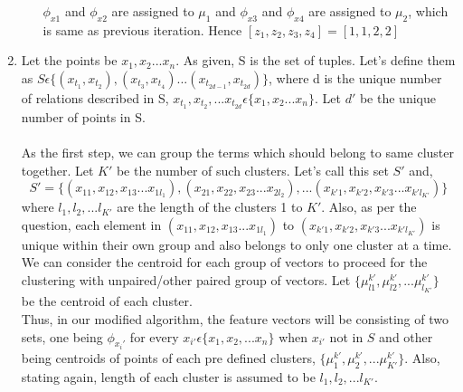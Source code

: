 \documentclass[12pt]{article}
\begin{document}
\begin{enumerate}[label=(\alph*)]
\begin{enumerate}[label=(\arabic*)]
	$\phi_{x1}$ and $\phi_{x2}$ are assigned to $\mu_1$ and $\phi_{x3}$ and $\phi_{x4}$ are assigned to $\mu_2$, which is same as previous iteration. Hence $[z_1, z_2, z_3, z_4] = [1,1,2,2] $\\
	\end{enumerate}
	\item Let the points be $x_1, x_2 ... x_n$. As given, S is the set of tuples. Let's define them as $S \epsilon \{(x_{t_1}, x_{t_2}), (x_{t_3}, x_{t_4})...(x_{t_{2d-1}}, x_{t_{2d}})\}$, where d is the unique number of relations described in S, $x_{t_1}, x_{t_2}, ... x_{t_{2d}} \epsilon \{x_1, x_2 ... x_n\}$. Let $d'$ be the unique number of points in S. \\ \\
	As the first step, we can group the terms which should belong to same cluster together. Let $K'$ be the number of such clusters. Let's call this set $S'$ and, $$S' = \{(x_{11}, x_{12}, x_{13} ... x_{1l_1}), (x_{21}, x_{22}, x_{23} ... x_{2l_2}), ... (x_{k'1}, x_{k'2}, x_{k'3} ... x_{k'l_{K'}})\}$$
	where $l_1, l_2, ... l_{K'}$ are the length of the clusters 1 to $K'$. Also, as per the question, each element in $(x_{11}, x_{12}, x_{13} ... x_{1l_1})$ to $(x_{k'1}, x_{k'2}, x_{k'3} ... x_{k'l_{K'}})$ is unique within their own group and also belongs to only one cluster at a time. \\
	We can consider the centroid for each group of vectors to proceed for the clustering with unpaired/other paired group of vectors. Let $\{ \mu_{l1}^{k'}, \mu_{l2}^{k'}, ... \mu_{l_{K'}}^{k'} \}$ be the centroid of each cluster. \\
	Thus, in our modified algorithm, the feature vectors will be consisting of two sets, one being $\phi_{x_i'}$ for every $x_{i'} \epsilon \{x_1, x_2, ... x_n\}$ when $x_{i'}$ not in $S$ and other being centroids of points of each pre defined clusters, $\{ \mu_{1}^{k'}, \mu_{2}^{k'}, ... \mu_{K'}^{k'} \}$. Also, stating again, length of each cluster is assumed to be $l_1, l_2, ... l_{K'}$. \\ \\
	

\end{enumerate}
\end{document}
